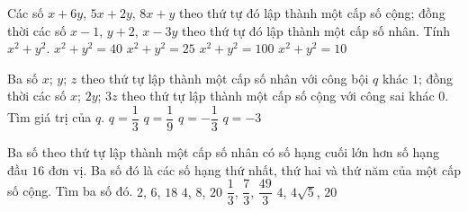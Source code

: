 \begin{ex}%
	Các số $x+6y$,  $5x+2y$, $8x+y$ theo thứ tự đó lập thành một cấp số cộng; đồng thời các số $x-1$, $y+2$, $ x-3y$ theo thứ tự đó lập thành một cấp số nhân. Tính $x^2+y^2$.
	 \choice
		{\True  $x^2+y^2=40$}
		{$x^2+y^2=25$} 
		{$x^2+y^2=100$} 
		{$x^2+y^2=10$} 
\end{ex}

\begin{ex}%
	Ba số $x$; $y$; $z$ theo  thứ tự lập thành một cấp số nhân với công bội $q$ khác $1$; đồng thời các số $x$; $2y$; $3z$ theo thứ tự lập thành một cấp số cộng với công sai khác $0$. Tìm giá trị của $q$.
	\choice 
		{\True  $q=\dfrac{1}{3}$}
		{$q=\dfrac{1}{9}$} 
		{$q=-\dfrac{1}{3}$} 
		{$q=-3$} 
\end{ex}

\begin{ex}%
	Ba số theo thứ tự lập thành một cấp số nhân có số hạng cuối lớn hơn số hạng đầu $16$ đơn vị. Ba số đó là các số hạng thứ nhất, thứ hai và thứ năm của một cấp số cộng. Tìm ba số đó. 
	\choice 
		 {$2$, $6$, $18$}
		{$4$, $8$,  $20$}
		{$\dfrac{1}{3}$,  $\dfrac{7}{3}$, $\dfrac{49}{3}$}
		{$4$,  $4\sqrt{5}$, $20$}
\end{ex}

